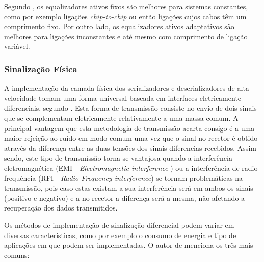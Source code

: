 Segundo \cite{R032}, os equalizadores ativos fixos são melhores para sistemas constantes, como por exemplo ligações \textit{chip-to-chip} ou então ligações cujos cabos têm um comprimento fixo. Por outro lado, os equalizadores ativos adaptativos são melhores para ligações inconstantes e até mesmo com comprimento de ligação variável.
%
%
%


\subsubsection*{Sinalização Física} \label{subsub:sinalizacao_fisica}


A implementação da camada física dos serializadores e deserializadores de alta velocidade tomam uma forma universal baseada em interfaces eletricamente diferenciais, segundo \cite{R032}. Esta forma de transmissão consiste no envio de dois sinais que se complementam eletricamente relativamente a uma massa comum. A principal vantagem que esta metodologia de transmissão acarta consigo é a uma maior rejeição ao ruído em modo-comum uma vez que o sinal no recetor é obtido através da diferença entre as duas tensões dos sinais diferencias recebidos. Assim sendo, este tipo de transmissão torna-se vantajosa quando a interferência eletromagnética (EMI - \textit{Electromagnetic interference} ) ou a interferência de radio-frequência (RFI - \textit{Radio Frequency interference}) se tornam problemáticas na transmissão, pois caso estas existam a sua interferência será em ambos os sinais (positivo e negativo) e a no recetor a diferença será a mesma, não afetando a recuperação dos dados transmitidos.

Os métodos de implementação de sinalização diferencial podem variar em diversas características, como por exemplo o consumo de energia e tipo de aplicações em que podem ser implementadas. O autor de \cite{R032} menciona os três mais comuns:


